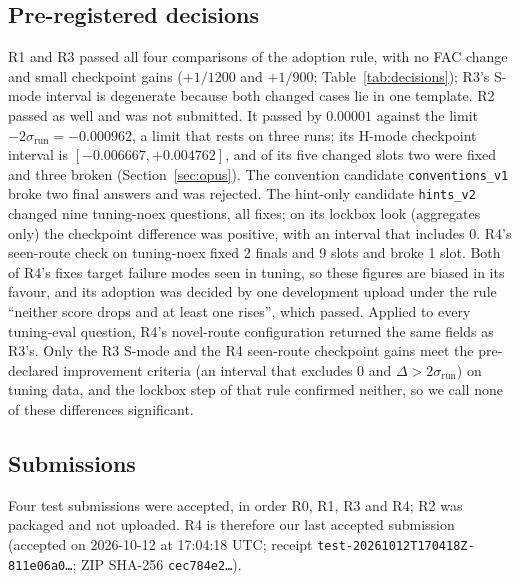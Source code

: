 \documentclass[conference]{IEEEtran}
\newcommand{\id}[1]{\texttt{#1}}
\begin{document}
\subsection{Pre-registered decisions}\label{sec:decisions}
R1 and R3 passed all four comparisons of the adoption rule, with no FAC change and small checkpoint gains ($+1/1200$ and $+1/900$; Table~\ref{tab:decisions}); R3's S-mode interval is degenerate because both changed cases lie in one template. R2 passed as well and was not submitted. It passed by $0.00001$ against the limit $-2\sigma_{\mathrm{run}}=-0.000962$, a limit that rests on three runs; its H-mode checkpoint interval is $[-0.006667,+0.004762]$, and of its five changed slots two were fixed and three broken (Section~\ref{sec:opus}). The convention candidate \id{conventions\_v1} broke two final answers and was rejected. The hint-only candidate \id{hints\_v2} changed nine tuning-noex questions, all fixes; on its lockbox look (aggregates only) the checkpoint difference was positive, with an interval that includes 0. R4's seen-route check on tuning-noex fixed 2 finals and 9 slots and broke 1 slot. Both of R4's fixes target failure modes seen in tuning, so these figures are biased in its favour, and its adoption was decided by one development upload under the rule ``neither score drops and at least one rises'', which passed. Applied to every tuning-eval question, R4's novel-route configuration returned the same fields as R3's. Only the R3 S-mode and the R4 seen-route checkpoint gains meet the pre-declared improvement criteria (an interval that excludes 0 and $\Delta>2\sigma_{\mathrm{run}}$) on tuning data, and the lockbox step of that rule confirmed neither, so we call none of these differences significant.

\subsection{Submissions}
Four test submissions were accepted, in order R0, R1, R3 and R4; R2 was packaged and not uploaded. R4 is therefore our last accepted submission (accepted on 2026-10-12 at 17:04:18 UTC; receipt \id{test-20261012T170418Z-811e06a0\ldots}; ZIP SHA-256 \id{cec784e2\ldots}).
\end{document}
